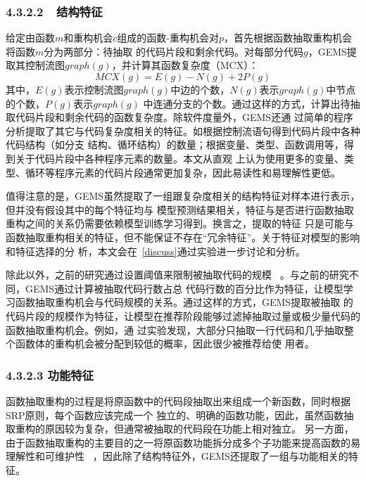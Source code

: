 \subsubsection{4.3.2.2~~结构特征}

给定由函数$m$和重构机会$c$组成的函数-重构机会对$p$，首先根据函数抽取重构机会将函数$m$分为两部分：待抽取
的代码片段和剩余代码。对每部分代码$g$，GEMS提取其控制流图$graph(g)$，并计算其函数复杂度（MCX）：
\begin{equation}
   MCX(g) = E(g) - N(g) + 2P(g)
\end{equation}
其中，$E(g)$表示控制流图$graph(g)$中边的个数，$N(g)$表示$graph(g)$中节点的个数，$P(g)$表示$graph(g)$
中连通分支的个数。通过这样的方式，计算出待抽取代码片段和剩余代码的函数复杂度。除软件度量外，GEMS还通
过简单的程序分析提取了其它与代码复杂度相关的特征。如根据控制流语句得到代码片段中各种代码结构（如分支
结构、循环结构）的数量；根据变量、类型、函数调用等，得到关于代码片段中各种程序元素的数量。本文从直观
上认为使用更多的变量、类型、循环等程序元素的代码片段通常更加复杂，因此易读性和易理解性更低。

值得注意的是，GEMS虽然提取了一组跟复杂度相关的结构特征对样本进行表示，但并没有假设其中的每个特征均与
模型预测结果相关，特征与是否进行函数抽取重构之间的关系仍需要依赖模型训练学习得到。换言之，提取的特征
只是可能与函数抽取重构相关的特征，但不能保证不存在``冗余特征''。关于特征对模型的影响和特征选择的分
析，本文会在~\ref{discuss}通过实验进一步讨论和分析。

除此以外，之前的研究通过设置阈值来限制被抽取代码的规模
~\cite{silva:ICPC14,charalampidou2016identifying}。与之前的研究不同，GEMS通过计算被抽取代码行数占总
代码行数的百分比作为特征，让模型学习函数抽取重构机会与代码规模的关系。通过这样的方式，GEMS提取被抽取
的代码片段的规模作为特征，让模型在推荐阶段能够过滤掉抽取过量或极少量代码的函数抽取重构机会。例如，通
过实验发现，大部分只抽取一行代码和几乎抽取整个函数体的重构机会被分配到较低的概率，因此很少被推荐给使
用者。

\subsubsection{4.3.2.3 功能特征}

函数抽取重构的过程是将原函数中的代码段抽取出来组成一个新函数，同时根据SRP原则，每个函数应该完成一个
独立的、明确的函数功能，因此，虽然函数抽取重构的原因较为复杂，但通常被抽取的代码段在功能上相对独立。
另一方面，由于函数抽取重构的主要目的之一将原函数功能拆分成多个子功能来提高函数的易理解性和可维护性
~\cite{silva2016we}，因此除了结构特征外，GEMS还提取了一组与功能相关的特征。

